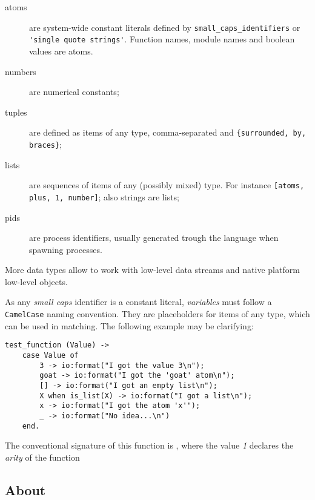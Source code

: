 \begin{description}

    \item[atoms] are system-wide constant literals defined by
        \lstinline{small_caps_identifiers} or
        \lstinline{'single quote strings'}. Function names, module
        names and boolean values are atoms.

    \item[numbers] are numerical constants;

    \item[tuples] are defined as items of any type, comma-separated and
        \lstinline|{surrounded, by, braces}|;

    \item[lists] are sequences of items of any (possibly mixed) type.
        For instance
        \lstinline{[atoms, plus, 1, number]}; also strings are lists;

    \item[pids] are process identifiers, usually generated trough the
        language  when spawning processes.

\end{description}

More data types allow to work with low-level data streams and native
platform low-level objects.

As any \emph{small caps} identifier is a constant literal,
\emph{variables} must follow a \lstinline{CamelCase} naming convention.
They are placeholders for items of any type, which can be used in
matching. The following example may be clarifying:

\begin{lstlisting}
test_function (Value) ->
    case Value of
        3 -> io:format("I got the value 3\n");
        goat -> io:format("I got the 'goat' atom\n");
        [] -> io:format("I got an empty list\n");
        X when is_list(X) -> io:format("I got a list\n");
        x -> io:format("I got the atom 'x'");
        _ -> io:format("No idea...\n")
    end.
\end{lstlisting}

The conventional signature of this function is ,
where the value \emph{1} declares the \emph{arity} of the function

\subsection{About \OTP}

